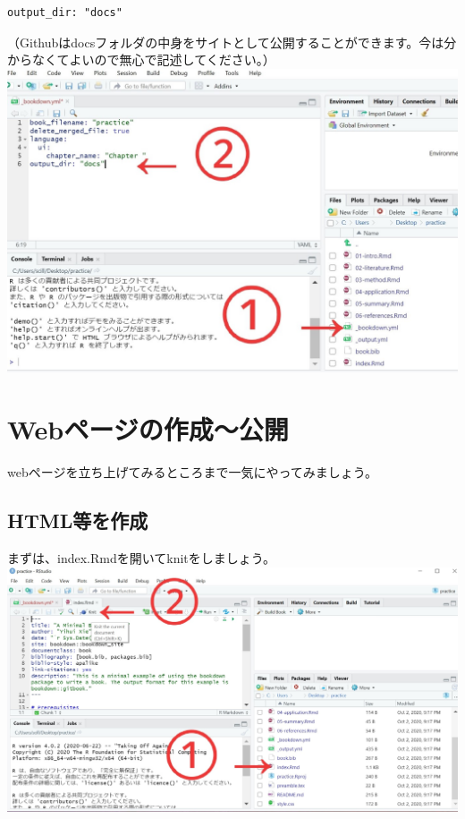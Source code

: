 \documentclass[
]{book}
\begin{document}
\begin{verbatim}
output_dir: "docs"
\end{verbatim}

（Githubはdocsフォルダの中身をサイトとして公開することができます。今は分からなくてよいので無心で記述してください。）
\includegraphics{pics/output_docs.jpg}

\hypertarget{webux30daux30fcux30b8ux306eux4f5cux6210ux516cux958b}{%
\chapter{Webページの作成～公開}\label{webux30daux30fcux30b8ux306eux4f5cux6210ux516cux958b}}

webページを立ち上げてみるところまで一気にやってみましょう。

\hypertarget{htmlux7b49ux3092ux4f5cux6210}{%
\section{HTML等を作成}\label{htmlux7b49ux3092ux4f5cux6210}}

まずは、index.Rmdを開いてknitをしましょう。
\includegraphics{pics/knit.jpg}
\end{document}
